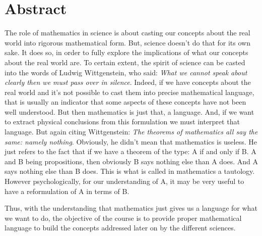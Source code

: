 \documentclass[../root.tex]{subfiles}
\begin{document}
\chapter{Abstract}
The role of mathematics in science is about casting our concepts about the real world into rigorous mathematical form. But, science doesn't do that for its own sake. It does so, in order to fully explore the implications of what our concepts about the real world are. To certain extent, the spirit of science can be casted into the words of Ludwig Wittgenstein, who said: \emph{What we cannot speak about clearly then we must pass over in silence}. Indeed, if we have concepts about the real world and it's not possible to cast them into precise mathematical language, that is usually an indicator that some aspects of these concepts have not been well understood. But then mathematics is just that, a language. And, if we want to extract physical conclusions from this formulation we must interpret that language. But again citing Wittgenstein: \emph{The theorems of mathematics all say the same: namely nothing}. Obviously, he didn't mean that mathematics is useless. He just refers to the fact that if we have a theorem of the type: A if and only if B. A and B being propositions, then obviously B says nothing else than A does. And A says nothing else than B does. This is what is called in mathematics a tautology. However psychologically, for our understanding of A, it may be very useful to have a reformulation of A in terms of B. 

Thus, with the understanding that mathematics just gives us a language for what we want to do, the objective of the course is to provide proper mathematical language to build the concepts addressed later on by the different sciences.
\end{document}
